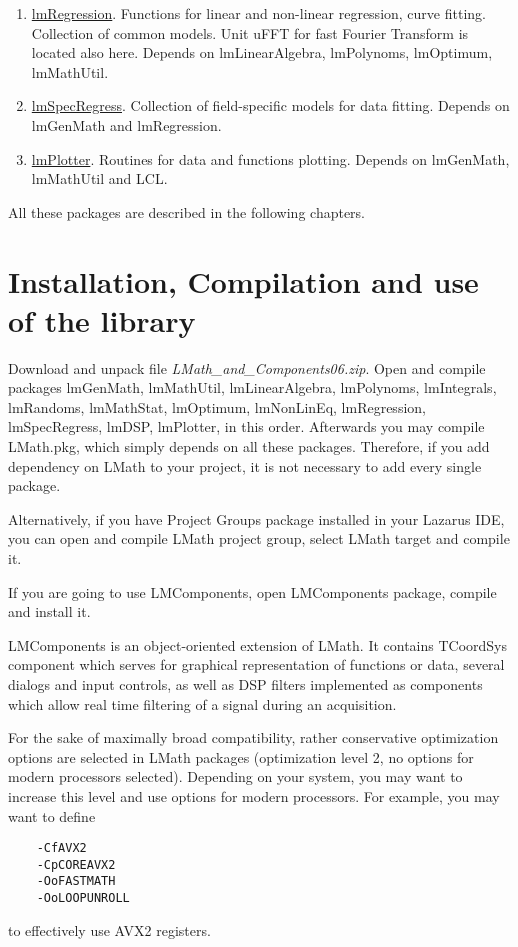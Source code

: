 \documentclass[12pt,a4paper,oneside]{report}
\begin{document}
\begin{enumerate}
	\item{\hyperref[package-lmRegression]{lmRegression}.} Functions for linear and non-linear regression, curve fitting. Collection of common models. Unit uFFT for fast Fourier Transform is located also here.  Depends on lmLinearAlgebra, lmPolynoms, lmOptimum, lmMathUtil.
	\item{\hyperref[package-lmSpecRegress]{lmSpecRegress}.} Collection of field-specific models for data fitting. Depends on lmGenMath and lmRegression.
	\item{\hyperref[package-lmPlotter]{lmPlotter}.} Routines for data and functions plotting. Depends on lmGenMath, lmMathUtil and LCL.
\end{enumerate}	
All these packages are described in the following chapters. 
\section{Installation, Compilation and use of the library}
Download and unpack file \textit{LMath\_and\_Components06.zip}. Open and compile packages lmGenMath, lmMathUtil, lmLinearAlgebra, lmPolynoms, lmIntegrals, lmRandoms, lmMathStat, lmOptimum, lmNonLinEq, lmRegression, lmSpecRegress, lmDSP, lmPlotter, in this order. Afterwards you may compile LMath.pkg, which simply depends on all these packages. Therefore, if you add dependency on LMath to your project, it is not necessary to add every single package.

Alternatively, if you have Project Groups package installed in your Lazarus IDE, you can open and compile LMath project group, select LMath target and compile it.

If you are going to use LMComponents, open LMComponents package, compile and install it.

LMComponents is an object-oriented extension of LMath. It contains TCoordSys component which serves for graphical representation of functions or data, several dialogs and input controls, as well as DSP filters implemented as components which allow real time filtering of a signal during an acquisition.

For the sake of maximally broad compatibility, rather conservative optimization options are selected in LMath packages (optimization level 2, no options for modern processors selected). Depending on your system, you may want to increase this level and use options for modern processors. For example, you may want to define
\begin{verbatim}
	-CfAVX2
	-CpCOREAVX2
	-OoFASTMATH
	-OoLOOPUNROLL
\end{verbatim}
to effectively use AVX2 registers.
\end{document}

